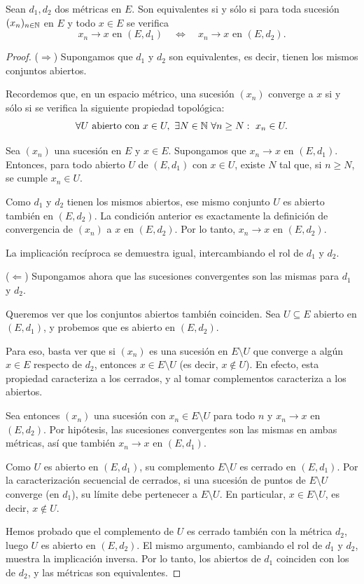 \begin{prop}
Sean $d_1,d_2$ dos métricas en $E$. Son equivalentes si y sólo si
para toda sucesión $(x_n)_{n\in\mathbb{N}}$ en $E$ y todo $x \in E$ se verifica
\[
x_n \to x \text{ en } (E,d_1)
\quad \Longleftrightarrow \quad
x_n \to x \text{ en } (E,d_2).
\]
\end{prop}

\begin{proof}
($\Rightarrow$) Supongamos que $d_1$ y $d_2$ son equivalentes, es decir,
tienen los mismos conjuntos abiertos.

Recordemos que, en un espacio métrico, una sucesión $(x_n)$ converge a $x$
si y sólo si se verifica la siguiente propiedad topológica:
\[
\forall U \text{ abierto con } x \in U,\ \exists N \in \mathbb{N}\ \forall n \ge N:
\ x_n \in U.
\]

Sea $(x_n)$ una sucesión en $E$ y $x \in E$.
Supongamos que $x_n \to x$ en $(E,d_1)$.
Entonces, para todo abierto $U$ de $(E,d_1)$ con $x \in U$, existe
$N$ tal que, si $n \ge N$, se cumple $x_n \in U$.

Como $d_1$ y $d_2$ tienen los mismos abiertos, ese mismo conjunto $U$
es abierto también en $(E,d_2)$. La condición anterior es exactamente
la definición de convergencia de $(x_n)$ a $x$ en $(E,d_2)$. Por lo tanto,
$x_n \to x$ en $(E,d_2)$.

La implicación recíproca se demuestra igual, intercambiando el rol de
$d_1$ y $d_2$.

\medskip

($\Leftarrow$) Supongamos ahora que las sucesiones convergentes son las
mismas para $d_1$ y $d_2$.

Queremos ver que los conjuntos abiertos también coinciden.
Sea $U \subseteq E$ abierto en $(E,d_1)$, y probemos que es abierto en
$(E,d_2)$.

Para eso, basta ver que si $(x_n)$ es una sucesión en $E \setminus U$
que converge a algún $x \in E$ respecto de $d_2$, entonces
$x \in E \setminus U$ (es decir, $x \notin U$). En efecto, esta propiedad
caracteriza a los cerrados, y al tomar complementos caracteriza a los
abiertos.

Sea entonces $(x_n)$ una sucesión con $x_n \in E \setminus U$ para todo $n$
y $x_n \to x$ en $(E,d_2)$. Por hipótesis, las sucesiones convergentes son
las mismas en ambas métricas, así que también $x_n \to x$ en $(E,d_1)$.

Como $U$ es abierto en $(E,d_1)$, su complemento $E \setminus U$ es cerrado
en $(E,d_1)$. Por la caracterización secuencial de cerrados,
si una sucesión de puntos de $E \setminus U$ converge (en $d_1$),
su límite debe pertenecer a $E \setminus U$. En particular,
$x \in E \setminus U$, es decir, $x \notin U$.

Hemos probado que el complemento de $U$ es cerrado también con la métrica
$d_2$, luego $U$ es abierto en $(E,d_2)$. El mismo argumento, cambiando
el rol de $d_1$ y $d_2$, muestra la implicación inversa. Por lo tanto,
los abiertos de $d_1$ coinciden con los de $d_2$, y las métricas son
equivalentes.
\end{proof}

